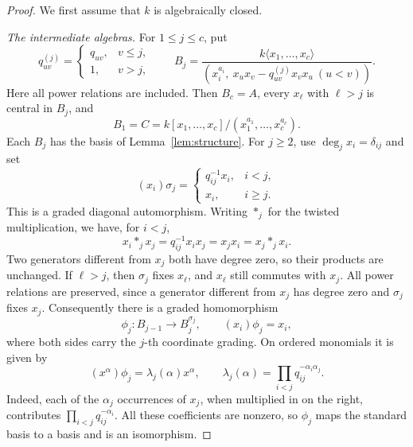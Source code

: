 \documentclass[11pt,a4paper]{article}
\numberwithin{equation}{section}
\theoremstyle{definition}
\theoremstyle{plain}
\theoremstyle{remark}
\begin{document}
\begin{proof}
We first assume that \(k\) is algebraically closed.

\smallskip\noindent
\emph{The intermediate algebras.}
For \(1\leq j\leq c\), put
\begin{equation*}
 q_{uv}^{(j)}=
 \begin{cases}q_{uv},&v\leq j,\\1,&v>j,\end{cases}
 \qquad
 B_j=\frac{k\langle x_1,\ldots,x_c\rangle}
 {(x_i^{a_i},\ x_ux_v-q_{uv}^{(j)}x_vx_u\ (u<v))}.
\end{equation*}
Here all power relations are included. Then \(B_c=A\), every
\(x_\ell\) with \(\ell>j\) is central in \(B_j\), and
\[
 B_1=C=k[x_1,\ldots,x_c]/(x_1^{a_1},\ldots,x_c^{a_c}).
\]
Each \(B_j\) has the basis of Lemma~\ref{lem:structure}.
For \(j\geq2\), use \(\deg_jx_i=\delta_{ij}\) and set
\begin{equation*}
 (x_i)\sigma_j=
 \begin{cases}q_{ij}^{-1}x_i,&i<j,\\x_i,&i\geq j.\end{cases}
\end{equation*}
This is a graded diagonal automorphism. Writing \(*_j\) for the
twisted multiplication, we have, for \(i<j\),
\begin{equation*}
 x_i*_jx_j=q_{ij}^{-1}x_ix_j=x_jx_i=x_j*_jx_i.
\end{equation*}
Two generators different from \(x_j\) both have degree zero, so their
products are unchanged. If \(\ell>j\), then \(\sigma_j\) fixes
\(x_\ell\), and \(x_\ell\) still commutes with \(x_j\).
All power relations are preserved, since a generator different from
\(x_j\) has degree zero and \(\sigma_j\) fixes \(x_j\).
Consequently there is a graded homomorphism
\begin{equation*}
 \phi_j:B_{j-1}\longrightarrow B_j^{\sigma_j},\qquad
 (x_i)\phi_j=x_i,
\end{equation*}
where both sides carry the \(j\)-th coordinate grading. On ordered
monomials it is given by
\begin{equation*}
 (x^\alpha)\phi_j=\lambda_j(\alpha)x^\alpha,
 \qquad \lambda_j(\alpha)=\prod_{i<j}q_{ij}^{-\alpha_i\alpha_j}.
\end{equation*}
Indeed, each of the \(\alpha_j\) occurrences of \(x_j\), when multiplied
in on the right, contributes \(\prod_{i<j}q_{ij}^{-\alpha_i}\).
All these coefficients are nonzero, so \(\phi_j\) maps the standard
basis to a basis and is an isomorphism.


\end{proof}
\end{document}

